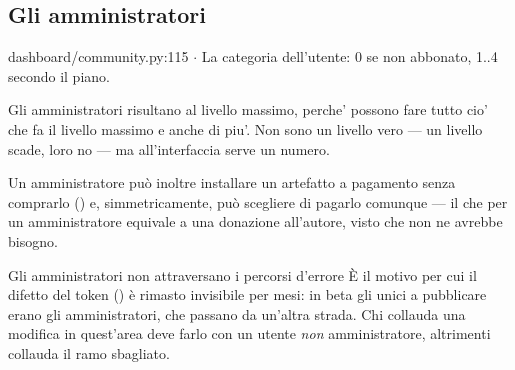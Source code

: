 \subsection{Gli amministratori}

\begin{commento}{dashboard/community.py:115 $\cdot$ }
La categoria dell'utente: 0 se non abbonato, 1..4 secondo il piano.

Gli amministratori risultano al livello massimo, perche' possono fare
tutto cio' che fa il livello massimo e anche di piu'. Non sono un livello
vero — un livello scade, loro no — ma all'interfaccia serve un numero.
\end{commento}

\noindent
Un amministratore può inoltre installare un artefatto a pagamento senza
comprarlo () e,
simmetricamente, può scegliere di pagarlo comunque --- il che per un
amministratore equivale a una donazione all'autore, visto che non ne avrebbe
bisogno.

\begin{attenzione}{Gli amministratori non attraversano i percorsi d'errore}
È il motivo per cui il difetto del token () è rimasto
invisibile per mesi: in beta gli unici a pubblicare erano gli
amministratori, che passano da un'altra strada. Chi collauda una modifica in
quest'area deve farlo con un utente \emph{non} amministratore, altrimenti
collauda il ramo sbagliato.
\end{attenzione}

\flushbottom
